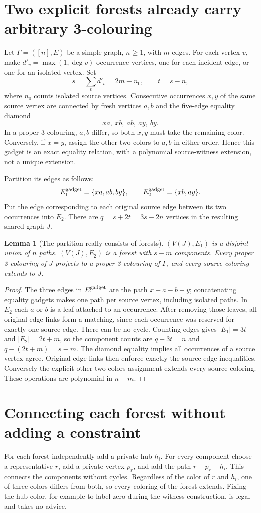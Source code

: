 \documentclass[11pt]{article}
\newtheorem{lemma}[theorem]{Lemma}
\begin{document}
\section{Two explicit forests already carry arbitrary 3-colouring}
Let $\Gamma=([n],E)$ be a simple graph, $n\ge1$, with $m$ edges. For each
vertex $v$, make $d'_v=\max(1,\deg v)$ occurrence vertices, one for each
incident edge, or one for an isolated vertex. Set
\[
 s=\sum_v d'_v=2m+n_0,\qquad t=s-n,
\]
where $n_0$ counts isolated source vertices. Consecutive occurrences $x,y$
of the same source vertex are connected by fresh vertices $a,b$ and the
five-edge equality diamond
\[
 xa,\ xb,\ ab,\ ay,\ by.
\]
In a proper 3-colouring, $a,b$ differ, so both $x,y$ must take the remaining
color. Conversely, if $x=y$, assign the other two colors to $a,b$ in either
order. Hence this gadget is an exact equality relation, with a polynomial
source-witness extension, not a unique extension.

Partition its edges as follows:
\[
 E_1^{\rm gadget}=\{xa,ab,by\},\qquad
 E_2^{\rm gadget}=\{xb,ay\}.
\]
Put the edge corresponding to each original source edge between its two
occurrences into $E_2$. There are $q=s+2t=3s-2n$ vertices in the resulting
shared graph $J$.

\begin{lemma}[The partition really consists of forests]\label{lem:forests}
$(V(J),E_1)$ is a disjoint union of $n$ paths. $(V(J),E_2)$ is a forest
with $s-m$ components. Every proper 3-colouring of $J$ projects to a proper
3-colouring of $\Gamma$, and every source coloring extends to $J$.
\end{lemma}
\begin{proof}
The three edges in $E_1^{\rm gadget}$ are the path $x-a-b-y$;
concatenating equality gadgets makes one path per source vertex, including
isolated paths. In $E_2$ each $a$ or $b$ is a leaf attached to an occurrence.
After removing those leaves, all original-edge links form a matching,
since each occurrence was reserved for exactly one source edge. There can
be no cycle. Counting edges gives $|E_1|=3t$ and $|E_2|=2t+m$, so the
component counts are $q-3t=n$ and $q-(2t+m)=s-m$.
The diamond equality implies all occurrences of a source vertex agree.
Original-edge links then enforce exactly the source edge inequalities.
Conversely the explicit other-two-colors assignment extends every source
coloring. These operations are polynomial in $n+m$.
\end{proof}

\section{Connecting each forest without adding a constraint}
For each forest independently add a private hub $h_i$. For every component
choose a representative $r$, add a private vertex $p_r$, and add the path
$r-p_r-h_i$. This connects the components without cycles. Regardless of the
color of $r$ and $h_i$, one of three colors differs from both, so every
coloring of the forest extends. Fixing the hub color, for example to label
zero during the witness construction, is legal and takes no advice.
\end{document}
